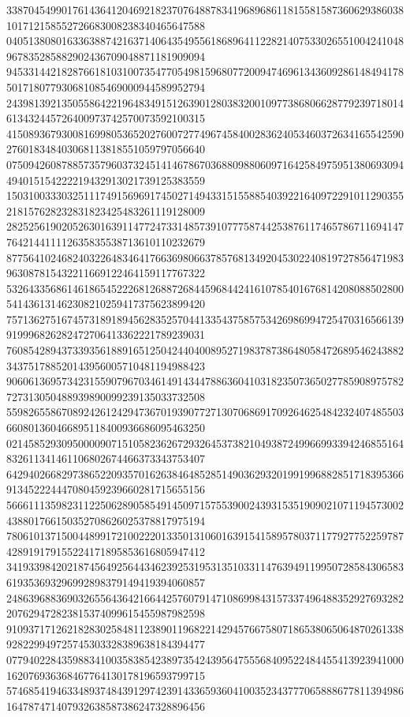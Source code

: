 \begin{DoxyCode}
      338704549901761436412046921823707648878341968968611815581587360629386038101712158552726683008238340465647588
      040513808016336388742163714064354955618689641122821407533026551004241048967835285882902436709048871181909094
      945331442182876618103100735477054981596807720094746961343609286148494178501718077930681085469000944589952794
      243981392135055864221964834915126390128038320010977386806628779239718014613432445726400973742570073592100315
      415089367930081699805365202760072774967458400283624053460372634165542590276018348403068113818551059797056640
      075094260878857357960373245141467867036880988060971642584975951380693094494015154222219432913021739125383559
      150310033303251117491569691745027149433151558854039221640972291011290355218157628232831823425483261119128009
      282525619020526301639114772473314857391077758744253876117465786711694147764214411112635835538713610110232679
      877564102468240322648346417663698066378576813492045302240819727856471983963087815432211669122464159117767322
      532643356861461865452226812688726844596844241610785401676814208088502800541436131462308210259417375623899420
      757136275167457318918945628352570441335437585753426986994725470316566139919996826282472706413362221789239031
      760854289437339356188916512504244040089527198378738648058472689546243882343751788520143956005710481194988423
      906061369573423155907967034614914344788636041031823507365027785908975782727313050488939890099239135033732508
      559826558670892426124294736701939077271307068691709264625484232407485503660801360466895118400936686095463250
      021458529309500009071510582362672932645373821049387249966993394246855164832611341461106802674466373343753407
      642940266829738652209357016263846485285149036293201991996882851718395366913452224447080459239660281715655156
      566611135982311225062890585491450971575539002439315351909021071194573002438801766150352708626025378817975194
      780610137150044899172100222013350131060163915415895780371177927752259787428919179155224171895853616805947412
      341933984202187456492564434623925319531351033114763949119950728584306583619353693296992898379149419394060857
      248639688369032655643642166442576079147108699843157337496488352927693282207629472823815374099615455987982598
      910937171262182830258481123890119682214294576675807186538065064870261338928229949725745303328389638184394477
      077940228435988341003583854238973542439564755568409522484455413923941000162076936368467764130178196593799715
      574685419463348937484391297423914336593604100352343777065888677811394986164787471407932638587386247328896456

\end{DoxyCode}

